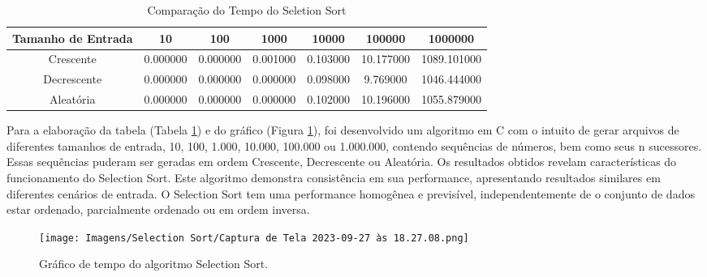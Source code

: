 \begin{table}[h]
    \centering
    \caption{Comparação do Tempo do Seletion Sort}
    \begin{tabular}{|c|c|c|c|c|c|c|}
        \hline
        Tamanho de Entrada & 10 & 100 & 1000 & 10000 & 100000 & 1000000 \\
        \hline
        Crescente & 0.000000 & 0.000000 & 0.001000 & 0.103000 & 10.177000 & 1089.101000 \\
        \hline
        Decrescente & 0.000000 & 0.000000 & 0.000000 & 0.098000 & 9.769000 & 1046.444000 \\
        \hline
        Aleatória & 0.000000 & 0.000000 & 0.000000 & 0.102000 & 10.196000 & 1055.879000 \\
        \hline
    \end{tabular}
    \label{tab:comparacaoinsert}
\end{table}

Para a elaboração da tabela (Tabela \ref{tab:comparacaoinsert}) e do gráfico (Figura \ref{fig:select1}), foi desenvolvido um algoritmo em C com o intuito de gerar arquivos de diferentes tamanhos de entrada, 10, 100, 1.000, 10.000, 100.000 ou 1.000.000, contendo sequências de números, bem como seus n sucessores. Essas sequências puderam ser geradas em ordem Crescente, Decrescente ou Aleatória. Os resultados obtidos revelam características do funcionamento do Selection Sort. Este algoritmo demonstra consistência em sua performance, apresentando resultados similares em diferentes cenários de entrada. O Selection Sort tem uma performance homogênea e previsível, independentemente de o conjunto de dados estar ordenado, parcialmente ordenado ou em ordem inversa.

\begin{figure}[h!]
    \centering
    \texttt{[image: Imagens/Selection Sort/Captura de Tela 2023-09-27 às 18.27.08.png]}
    \caption{Gráfico de tempo do algoritmo Selection Sort.}
    \label{fig:select1}
\end{figure}